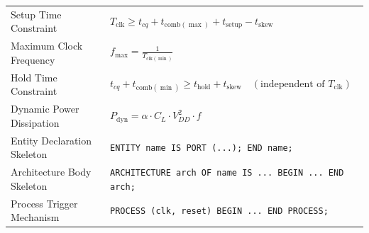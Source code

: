 \documentclass[12pt,a4paper]{article}
\renewcommand{\arraystretch}{1.45}
\begin{document}
\begin{tcolorbox}[formulabox, title={\textbf{Key Timing Constraints and VHDL Skeletons at a Glance}}]
\renewcommand{\arraystretch}{1.35}
\begin{tabularx}{\linewidth}{B{5.2cm} X}
Setup Time Constraint & $T_{\text{clk}} \ge t_{cq} + t_{\text{comb}(\max)} + t_{\text{setup}} - t_{\text{skew}}$ \\[4pt]
Maximum Clock Frequency & $f_{\max} = \frac{1}{T_{\text{clk}(\min)}}$ \\[4pt]
Hold Time Constraint & $t_{cq} + t_{\text{comb}(\min)} \ge t_{\text{hold}} + t_{\text{skew}} \quad (\text{independent of } T_{\text{clk}})$ \\[4pt]
Dynamic Power Dissipation & $P_{\text{dyn}} = \alpha \cdot C_L \cdot V_{DD}^2 \cdot f$ \\[4pt]
Entity Declaration Skeleton & \texttt{ENTITY name IS PORT (...); END name;} \\[4pt]
Architecture Body Skeleton & \texttt{ARCHITECTURE arch OF name IS ... BEGIN ... END arch;} \\[4pt]
Process Trigger Mechanism & \texttt{PROCESS (clk, reset) BEGIN ... END PROCESS;} \\[4pt]
\end{tabularx}
\end{tcolorbox}
\end{document}
